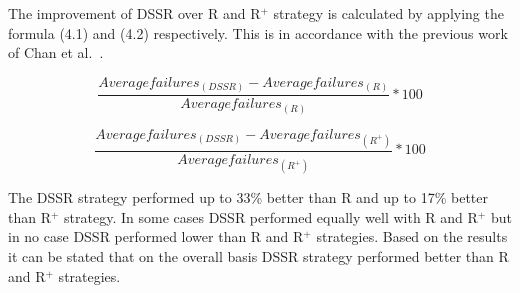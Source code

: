 The improvement of DSSR over R and R$^+$ strategy is calculated by applying the formula (4.1) and (4.2) respectively. This is in accordance with the previous work of Chan et al.~\cite{chan2004good}.

\begin{equation} \frac{Averagefailures_{(DSSR)} - Averagefailures_{(R)}}{Averagefailures_{(R)}} * 100  \end{equation}

\begin{equation} \frac{Averagefailures_{(DSSR)} - Averagefailures_{(R^+)}}{Averagefailures_{(R^+)}}  * 100 \end{equation}

The DSSR strategy performed up to 33\% better than R and up to 17\% better than R$^+$ strategy. In some cases DSSR performed equally well with R and R$^+$ but in no case DSSR performed lower than R and R$^+$ strategies. Based on the results it can be stated that on the overall basis DSSR strategy performed better than R and R$^+$ strategies. 

